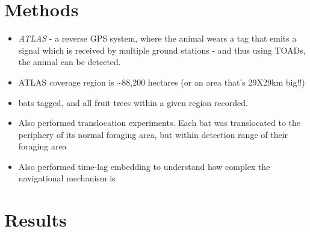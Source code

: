 \documentclass[
]{book}
\providecommand{\tightlist}{%
  \setlength{\itemsep}{0pt}\setlength{\parskip}{0pt}}
\begin{document}
\hypertarget{methods}{%
\section{Methods}\label{methods}}

\begin{itemize}
\tightlist
\item
  \emph{ATLAS} - a reverse GPS system, where the animal wears a tag that emits a signal which is received by multiple ground stations - and thus using TOADs, the animal can be detected.
\item
  ATLAS coverage region is \textasciitilde88,200 hectares (or an area that's 29X29km big!!)
\item
  bats tagged, and all fruit trees within a given region recorded.
\item
  Also performed translocation experiments. Each bat was translocated to the periphery of its normal foraging area, but within detection range of their foraging area
\item
  Also performed time-lag embedding to understand how complex the navigational mechanism is
\end{itemize}

\hypertarget{results}{%
\section{Results}\label{results}}
\end{document}
